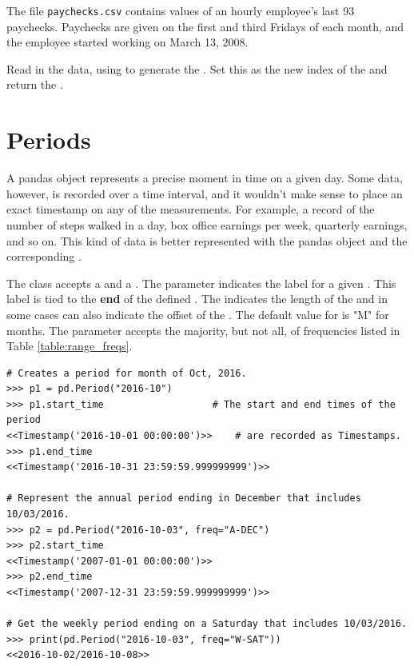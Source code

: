 \begin{problem} %
The file \texttt{paychecks.csv} contains values of an hourly employee's last 93 paychecks.
Paychecks are given on the first and third Fridays of each month, and the employee started working on March 13, 2008.

Read in the data, using  to generate the .
Set this as the new index of the  and return the .
\end{problem}

\section*{Periods} %

A pandas  object represents a precise moment in time on a given day.
Some data, however, is recorded over a time interval, and it wouldn't make sense to place an exact timestamp on any of the measurements.
For example, a record of the number of steps walked in a day, box office earnings per week, quarterly earnings, and so on.
This kind of data is better represented with the pandas  object and the corresponding .

The  class accepts a  and a .
The  parameter indicates the label for a given .
This label is tied to the \textbf{end} of the defined .
The  indicates the length of the  and in some cases can also indicate the offset of the .
The default value for  is "M" for months.
The  parameter accepts the majority, but not all, of frequencies listed in Table \ref{table:range_freqs}.

\begin{lstlisting}
# Creates a period for month of Oct, 2016.
>>> p1 = pd.Period("2016-10")
>>> p1.start_time                   # The start and end times of the period
<<Timestamp('2016-10-01 00:00:00')>>    # are recorded as Timestamps.
>>> p1.end_time
<<Timestamp('2016-10-31 23:59:59.999999999')>>

# Represent the annual period ending in December that includes 10/03/2016.
>>> p2 = pd.Period("2016-10-03", freq="A-DEC")
>>> p2.start_time
<<Timestamp('2007-01-01 00:00:00')>>
>>> p2.end_time
<<Timestamp('2007-12-31 23:59:59.999999999')>>

# Get the weekly period ending on a Saturday that includes 10/03/2016.
>>> print(pd.Period("2016-10-03", freq="W-SAT"))
<<2016-10-02/2016-10-08>>
\end{lstlisting}


